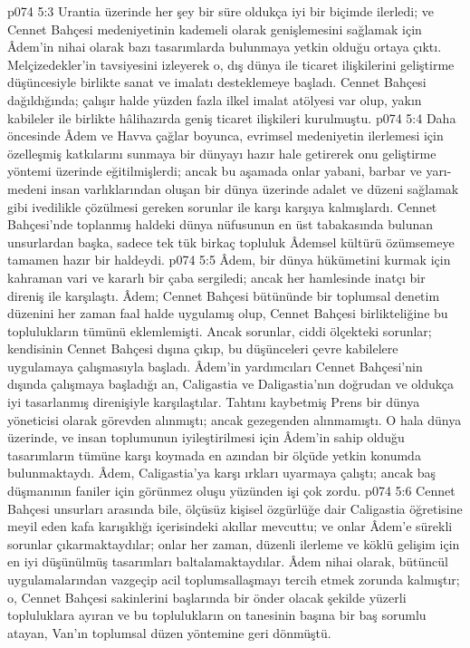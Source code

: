 \vs p074 5:3 Urantia üzerinde her şey bir süre oldukça iyi bir biçimde ilerledi; ve Cennet Bahçesi medeniyetinin kademeli olarak genişlemesini sağlamak için Âdem’in nihai olarak bazı tasarımlarda bulunmaya yetkin olduğu ortaya çıktı. Melçizedekler’in tavsiyesini izleyerek o, dış dünya ile ticaret ilişkilerini geliştirme düşüncesiyle birlikte sanat ve imalatı desteklemeye başladı. Cennet Bahçesi dağıldığında; çalışır halde yüzden fazla ilkel imalat atölyesi var olup, yakın kabileler ile birlikte hâlihazırda geniş ticaret ilişkileri kurulmuştu.
\vs p074 5:4 Daha öncesinde Âdem ve Havva çağlar boyunca, evrimsel medeniyetin ilerlemesi için özelleşmiş katkılarını sunmaya bir dünyayı hazır hale getirerek onu geliştirme yöntemi üzerinde eğitilmişlerdi; ancak bu aşamada onlar yabani, barbar ve yarı\hyp{}medeni insan varlıklarından oluşan bir dünya üzerinde adalet ve düzeni sağlamak gibi ivedilikle çözülmesi gereken sorunlar ile karşı karşıya kalmışlardı. Cennet Bahçesi’nde toplanmış haldeki dünya nüfusunun en üst tabakasında bulunan unsurlardan başka, sadece tek tük birkaç topluluk Âdemsel kültürü özümsemeye tamamen hazır bir haldeydi.
\vs p074 5:5 Âdem, bir dünya hükümetini kurmak için kahraman vari ve kararlı bir çaba sergiledi; ancak her hamlesinde inatçı bir direniş ile karşılaştı. Âdem; Cennet Bahçesi bütününde bir toplumsal denetim düzenini her zaman faal halde uygulamış olup, Cennet Bahçesi birlikteliğine bu toplulukların tümünü eklemlemişti. Ancak sorunlar, ciddi ölçekteki sorunlar; kendisinin Cennet Bahçesi dışına çıkıp, bu düşünceleri çevre kabilelere uygulamaya çalışmasıyla başladı. Âdem’in yardımcıları Cennet Bahçesi’nin dışında çalışmaya başladığı an, Caligastia ve Daligastia’nın doğrudan ve oldukça iyi tasarlanmış direnişiyle karşılaştılar. Tahtını kaybetmiş Prens bir dünya yöneticisi olarak görevden alınmıştı; ancak gezegenden alınmamıştı. O hala dünya üzerinde, ve insan toplumunun iyileştirilmesi için Âdem’in sahip olduğu tasarımların tümüne karşı koymada en azından bir ölçüde yetkin konumda bulunmaktaydı. Âdem, Caligastia’ya karşı ırkları uyarmaya çalıştı; ancak baş düşmanının faniler için görünmez oluşu yüzünden işi çok zordu.
\vs p074 5:6 Cennet Bahçesi unsurları arasında bile, ölçüsüz kişisel özgürlüğe dair Caligastia öğretisine meyil eden kafa karışıklığı içerisindeki akıllar mevcuttu; ve onlar Âdem’e sürekli sorunlar çıkarmaktaydılar; onlar her zaman, düzenli ilerleme ve köklü gelişim için en iyi düşünülmüş tasarımları baltalamaktaydılar. Âdem nihai olarak, bütüncül uygulamalarından vazgeçip acil toplumsallaşmayı tercih etmek zorunda kalmıştır; o, Cennet Bahçesi sakinlerini başlarında bir önder olacak şekilde yüzerli topluluklara ayıran ve bu toplulukların on tanesinin başına bir baş sorumlu atayan, Van’ın toplumsal düzen yöntemine geri dönmüştü.
